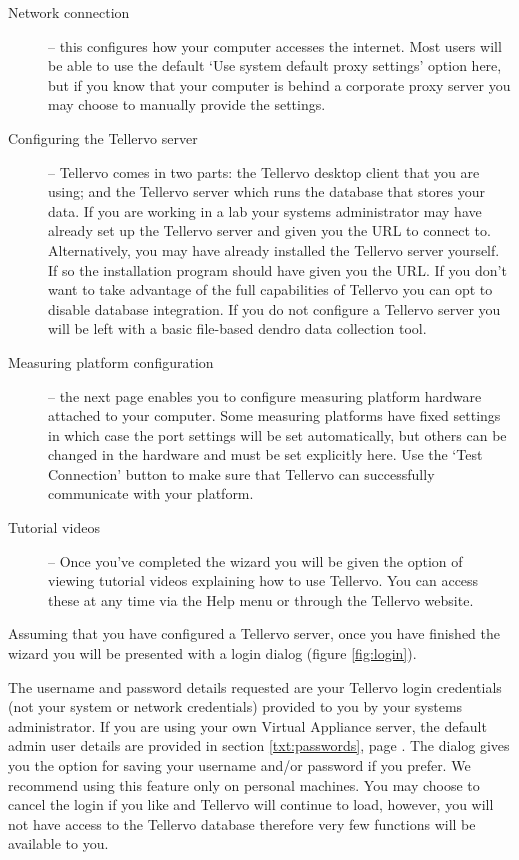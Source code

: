 \begin{description}
 \item[Network connection] -- this configures how your computer accesses the internet.  Most users will be able to use the default `Use system default proxy settings' option here, but if you know that your computer is behind a corporate proxy server you may choose to manually provide the settings.
 \item[Configuring the Tellervo server] -- Tellervo comes in two parts: the Tellervo desktop client that you are using; and the Tellervo server which runs the database that stores your data.  If you are working in a lab your systems administrator may have already set up the Tellervo server and given you the URL to connect to.  Alternatively, you may have already installed the Tellervo server yourself.  If so the installation program should have given you the URL. If you don't want to take advantage of the full capabilities of Tellervo you can opt to disable database integration.  If you do not configure a Tellervo server you will be left with a basic file-based dendro data collection tool.
 \item[Measuring platform configuration] -- the next page enables you to configure measuring platform hardware attached to your computer.  Some measuring platforms have fixed settings in which case the port settings will be set automatically, but others can be changed in the hardware and must be set explicitly here. Use the `Test Connection' button to make sure that Tellervo can successfully communicate with your platform.
 \item[Tutorial videos] -- Once you've completed the wizard you will be given the option of viewing tutorial videos explaining how to use Tellervo.  You can access these at any time via the Help menu or through the Tellervo website.
\end{description}


Assuming that you have configured a Tellervo server, once you have finished the wizard you will be presented with a login dialog (figure \ref{fig:login}).

The username and password details requested are your Tellervo login credentials (not your system or network credentials) provided to you by your systems administrator.  If you are using your own Virtual Appliance server, the default admin user details are provided in section \ref{txt:passwords}, page \pageref{txt:passwords}.  The dialog gives you the option for saving your username and/or password if you prefer.  We recommend using this feature only on personal machines.  You may choose to cancel the login if you like and Tellervo will continue to load, however, you will not have access to the Tellervo database therefore very few functions will be available to you.

